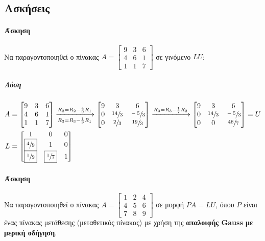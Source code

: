 \documentclass[11pt,a4paper,notitlepage,fleqn]{article}
\begin{document}
\subsection{Ασκήσεις}
\paragraph{Άσκηση}
Να παραγοντοποιηθεί ο πίνακας \( A=\left[\begin{matrix}
9&3&6\\4&6&1\\1&1&7
\end{matrix}\right] \) σε γινόμενο \( LU \):
\subparagraph{Λύση}
\begin{align*}
	A &= \left[\begin{matrix}
	9&3&6\\4&6&1\\1&1&7
	\end{matrix}\right]
	\xrightarrow[R_3=R_3-\frac{1}{9}R_1]{R_2=R_2-\frac{4}{9}R_1}
	\left[\begin{matrix}
	9&3&6\\0&\sfrac{14}{3}&\sfrac{-5}{3}\\
	0&\sfrac{2}{3} &\sfrac{19}{3}
	\end{matrix}\right]
	\xrightarrow{R_3=R_3-\frac{1}{7}R_2}\left[\begin{matrix}
	9&3&6\\0&\sfrac{14}{3} &\sfrac{-5}{3} \\
	0&0&\sfrac{46}{7} 
	\end{matrix}\right] = U \\
	L &= \left[\begin{matrix}
	1&0&0\\ \boxed{\sfrac{4}{9} } & 1 & 0 \\
	\boxed{\sfrac{1}{9} } & \boxed{\sfrac{1}{7} } & 1
	\end{matrix}\right]
\end{align*}

\paragraph{Άσκηση}
Να παραγοντοποιηθεί ο πίνακας
\(
A=\left[\begin{matrix}
1&2&4\\4&5&6\\7&8&9
\end{matrix}\right]
\) σε μορφή \( PA=LU \), όπου \( P \) είναι ένας πίνακας μετάθεσης
(μεταθετικός πίνακας) με χρήση της
\textbf{απαλοιφής Gauss με μερική οδήγηση}.
\end{document}
